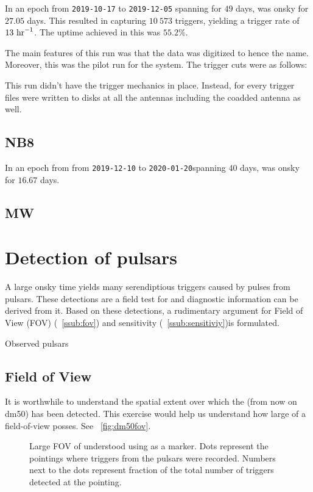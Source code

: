 \par In an epoch from \texttt{2019-10-17} to \texttt{2019-12-05} spanning for $49$ days, \vf was onsky for $27.05$ days. 
This resulted in capturing $10\ 573$ triggers, yielding a trigger rate of $13\ {\rm hr}^{-1}$. The uptime achieved in this was $55.2\%$.

\par The main features of this run was that the data was digitized to  hence the name. Moreover, this was the pilot run for the \vf system.
The trigger cuts were as follows:

\par This run didn't have the \dbson trigger mechanics in place. Instead, for every trigger \fbson~ files were written to disks at all the antennas including the coadded antenna as well.

\subsection {NB8}

\par In an epoch from from \texttt{2019-12-10} to \texttt{2020-01-20}spanning $40$ days, \vf was onsky for $16.67$ days.

\subsection {MW}


\section {Detection of pulsars}

\par A large onsky time yields many serendiptious triggers caused by pulses from pulsars. 
These detections are a field test for \vf and diagnostic information can be derived from it. 
Based on these detections, a rudimentary argument for Field of View (FOV) (~\autoref{ssub:fov}) and sensitivity (~\autoref{ssub:sensitiviy})is formulated.


\begin{table}
\caption {Observed pulsars}
\end{table}

\subsection{Field of View}
\label{ssub:fov}

\par It is worthwhile to understand the spatial extent over which the  (from now on dm50) has been detected. 
This exercise would help us understand how large of a field-of-view \vf posses.
See ~\autoref{fig:dm50fov}. 
\begin{figure}
	\label{fig:dm50fov}
	\caption{Large FOV of \vf understood using  as a marker. 
	Dots represent the pointings where triggers from the pulsars were recorded.
	Numbers next to the dots represent fraction of the total number of triggers detected at the pointing.
}
\end{figure}


